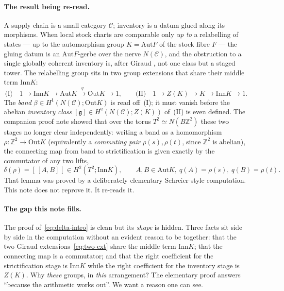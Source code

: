 \documentclass[11pt]{article}
\theoremstyle{definition}
\newcommand{\C}{\mathcal{C}}
\newcommand{\Z}{\mathbb{Z}}
\newcommand{\Aut}{\mathrm{Aut}}
\newcommand{\Inn}{\mathrm{Inn}}
\newcommand{\Out}{\mathrm{Out}}
\newcommand{\gerbe}{\mathfrak{g}}
\begin{document}
\paragraph{The result being re-read.} A supply chain is a small category $\C$; inventory is a
datum glued along its morphisms. When local stock charts are comparable only \emph{up to} a
relabelling of states --- up to the automorphism group $K=\Aut F$ of the stock fibre $F$ --- the
gluing datum is an $\Aut F$-gerbe over the nerve $N(\C)$, and the obstruction to a single globally
coherent inventory is, after Giraud \cite{giraud,breen}, not one class but a staged tower. The
relabelling group sits in two group extensions that share their middle term $\Inn K$:
\begin{equation}\label{eq:two-ext}
\text{(I)}\quad 1\to \Inn K\to \Aut K\xrightarrow{\ q\ }\Out K\to 1,
\qquad
\text{(II)}\quad 1\to Z(K)\to K\to \Inn K\to 1.
\end{equation}
The \emph{band} $\beta\in H^1(N(\C);\Out K)$ is read off~(I); it must vanish before the abelian
\emph{inventory class} $[\gerbe]\in H^2(N(\C);Z(K))$ of~(II) is even defined. The companion proof
note \cite{capstone} showed that over the torus $T^2\simeq N(B\Z^2)$ these two stages no longer
clear independently: writing a band as a homomorphism $\rho\colon\Z^2\to\Out K$ (equivalently a
\emph{commuting pair} $\rho(s),\rho(t)$, since $\Z^2$ is abelian), the connecting map from band to
strictification is given exactly by the commutator of any two lifts,
\begin{equation}\label{eq:delta-intro}
\delta(\rho)=[\,[A,B]\,]\in H^2(T^2;\Inn K),\qquad A,B\in\Aut K,\ q(A)=\rho(s),\ q(B)=\rho(t).
\end{equation}
That lemma was proved by a deliberately elementary Schreier-style computation. This note does not
reprove it. It re-reads it.

\paragraph{The gap this note fills.} The proof of~\eqref{eq:delta-intro} is clean but its
\emph{shape} is hidden. Three facts sit side by side in the computation without an evident reason
to be together: that the two Giraud extensions~\eqref{eq:two-ext} share the middle term $\Inn K$;
that the connecting map is a commutator; and that the right coefficient for the strictification
stage is $\Inn K$ while the right coefficient for the inventory stage is $Z(K)$. Why \emph{these}
groups, in \emph{this} arrangement? The elementary proof answers ``because the arithmetic works
out''. We want a reason one can see.
\end{document}
